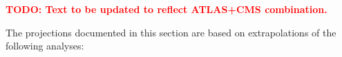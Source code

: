\renewcommand{\gg}{\ensuremath{\PGg\PGg}\xspace}
\newcommand{\hgg}{\ensuremath{\PH\to\gg}\xspace}
\newcommand{\ggh}{\ensuremath{\Pg\Pg\PH}\xspace}
\newcommand{\vbf}{\ensuremath{\mathrm{VBF}}\xspace}
\newcommand{\vh}{\ensuremath{\mathrm{V}\PH}\xspace}
\newcommand{\tth}{\ensuremath{\Pqt\Pqt\PH}\xspace}
\newcommand{\zz}{\ensuremath{\PZ\PZ}\xspace}
\newcommand{\hzz}{\ensuremath{\PH\to\zz}\xspace}
\newcommand{\hzzllll}{\ensuremath{\hzz^{(\ast)}\to 4\ell}\xspace}
\newcommand{\ww}{\ensuremath{\PW\PW}\xspace}
\newcommand{\hww}{\ensuremath{\PH\to\ww}\xspace}
\newcommand{\hwwlnln}{\ensuremath{\hww^{(\ast)}\to\ell\Pgn\ell\Pgn}\xspace}
\newcommand{\bb}{\ensuremath{\PQb\PQb}\xspace}
\newcommand{\hbb}{\ensuremath{\PH\to\bb}\xspace}
\newcommand{\tautau}{\ensuremath{\Pgt\Pgt}\xspace}
\newcommand{\htt}{\ensuremath{\PH\to\tautau}\xspace}
\newcommand{\hlep}{\ensuremath{\PH\to\text{leptons}}\xspace}
\newcommand{\mumu}{\ensuremath{\PGm\PGm}\xspace}
\newcommand{\hmm}{\ensuremath{\PH\to\mumu}\xspace}
\newcommand{\wh}{\ensuremath{\PW\PH}\xspace}
\newcommand{\zh}{\ensuremath{\PZ\PH}\xspace}
\providecommand{\fbinv}{\mbox{\ensuremath{\,\text{fb}^\text{$-$1}}}\xspace}
\newcommand{\SM}{\ensuremath{\mathrm{SM}}\xspace}
\newcommand{\kZ}{\ensuremath{\kappa_{\mathrm{\PZ}}}\xspace}
\newcommand{\kW}{\ensuremath{\kappa_{\mathrm{\PW}}}\xspace}
\newcommand{\ktau}{\ensuremath{\kappa_{\PGt}}\xspace}
\newcommand{\ktop}{\ensuremath{\kappa_{\Pqt}}\xspace}
\newcommand{\kb}{\ensuremath{\kappa_{\Pqb}}\xspace}
\newcommand{\kmu}{\ensuremath{\kappa_{\Pgm}}\xspace}
\newcommand{\kglu}{\ensuremath{\kappa_{\mathrm{\Pg}}}\xspace}
\newcommand{\kgam}{\ensuremath{\kappa_{\PGg}}\xspace}
\newcommand{\GammaSM}{\ensuremath{\Gamma_{\PH}/\Gamma_{\PH}^{\mathrm{SM}}}\xspace}
\newcommand{\Bbsm}{\ensuremath{\mathrm{B_{BSM}}}\xspace}
\newcommand{\kV}{\ensuremath{\kappa_{\mathrm{V}}}\xspace}
\providecommand{\wip}[1]{\textcolor{red}{\bfseries TODO: #1}\xspace}


\wip{Text to be updated to reflect ATLAS+CMS combination.}

The projections documented in this section are based on extrapolations of the following analyses:

